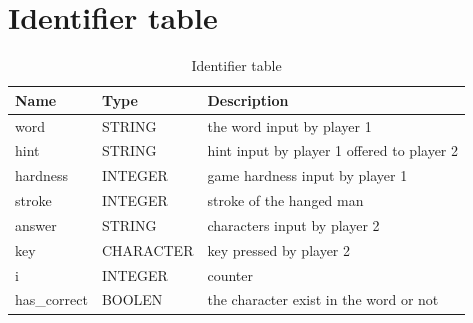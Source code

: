 \documentclass{article}
\begin{document}
    \newpage

    \section{Identifier table}
        \begin{table}[h]
            \begin{center}
                \begin{tabular}{|l|l|l|}
                    \hline
                    Name & Type & Description \\ \hline
                    word & STRING & the word input by player 1 \\ \hline
                    hint & STRING & hint input by player 1 offered to player 2 \\ \hline
                    hardness & INTEGER & game hardness input by player 1 \\ \hline
                    stroke & INTEGER & stroke of the hanged man \\ \hline
                    answer & STRING & characters input by player 2 \\ \hline
                    key & CHARACTER & key pressed by player 2 \\ \hline
                    i & INTEGER & counter \\ \hline
                    has_correct & BOOLEN & the character exist in the word or not \\ \hline
                \end{tabular}
            \end{center}
            \caption{Identifier table}
        \end{table}
    
    \newpage
\end{document}
